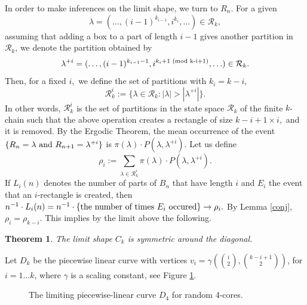 \documentclass[11pt]{amsart}
\newtheorem{theorem}{Theorem}[section]
\newcommand{\tn}[1]{\textnormal{#1}}
\begin{document}
In order to make inferences on the limit shape, we turn to $R_n.$ For a given \[\lambda=(\ldots,(i-1)^{k_{i-1}}, i^{k_i},\ldots) \in \mathcal{R}_k,\]
assuming that adding a box to a part of length $i-1$ gives another partition in $\mathcal{R}_k$, we denote the partition obtained by
\[\lambda^{+i}=(\ldots,(i-1)^{k_{i-1}-1}, i^{k_i+1\tn{ (mod k-i+1})},\ldots) \in \mathcal{R}_k.\]
Then, for a fixed $i,$ we define the set of partitions with $k_i=k-i$, 
\[\mathcal{R}_{k}^i:=\{\lambda \in \mathcal{R}_k : |\lambda| > |\lambda^{+i}|  \}.\]
In other words, $\mathcal{R}_{k}^i$ is the set of partitions in the state space $\mathcal{R}_k$ of the finite $k$-chain such 
that the above operation creates a rectangle of size $k-i+1 \times i,$ and it is removed.
By the Ergodic Theorem, %
the mean occurrence of the event 
$\{R_n=\lambda \tn{ and }R_{n+1}=\lambda^{+i}\}$
is $\pi(\lambda) \cdot P(\lambda,\lambda^{+i}).$ Let us define
\[\rho_i:=\sum_{\lambda \in \mathcal{R}_{k}^i} \pi(\lambda) \cdot P(\lambda,\lambda^{+i}).\]
If $L_i(n)$ denotes the number of parts of $B_n$ that have length $i$
and $E_i$ the event that an $i$-rectangle is created, then  
$n^{-1} \cdot L_i(n)=n^{-1} \cdot \{\textnormal{the number of times }E_i \tn{ occured}\}\rightarrow \rho_i.$
By Lemma \ref{conj}, $\rho_i=\rho_{k-i}.$ This implies by the limit above the following.
\begin{theorem} 
The limit shape $C_k$ is symmetric around the diagonal.
\end{theorem}

Let $D_{k}$ be the piecewise linear curve with vertices 
$v_i=\gamma(\binom{i}{2},\binom{k-i+1}{2})$, for $i=1\dots k$, where $\gamma
$ is a scaling constant,
see Figure \ref{F:corelimit}.

\begin{figure}[h]
\begin{center}
\end{center}
\caption{The limiting piecewise-linear curve $D_4$ for random 4-cores.}
\label{F:corelimit}
\end{figure}
\end{document}
